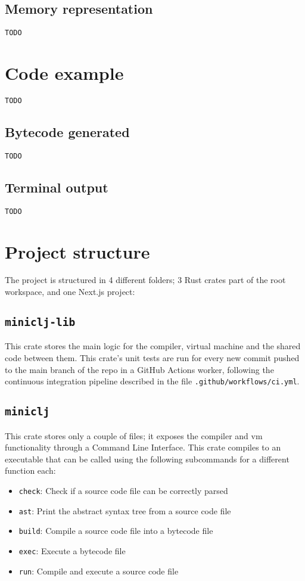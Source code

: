 \documentclass[11pt]{scrreprt}
\begin{document}
\section{Memory representation}
\texttt{TODO}


\chapter{Code example}
\texttt{TODO}

\section{Bytecode generated}
\texttt{TODO}

\section{Terminal output}
\texttt{TODO}


\chapter{Project structure}
The project is structured in 4 different folders; 3 Rust crates part of the root workspace, and one Next.js project:

\section{\texttt{miniclj-lib}}
This crate stores the main logic for the compiler, virtual machine and the shared code between them. This crate's unit tests are run for every new commit pushed to the main branch of the repo in a GitHub Actions worker, following the continuous integration pipeline described in the file \texttt{.github/workflows/ci.yml}.

\section{\texttt{miniclj}}
This crate stores only a couple of files; it exposes the compiler and vm functionality through a Command Line Interface. This crate compiles to an executable that can be called using the following subcommands for a different function each:
\begin{itemize}
  \item \texttt{check}: Check if a source code file can be correctly parsed 
  \item \texttt{ast}: Print the abstract syntax tree from a source code file
  \item \texttt{build}: Compile a source code file into a bytecode file
  \item \texttt{exec}: Execute a bytecode file
  \item \texttt{run}: Compile and execute a source code file
\end{itemize}
\end{document}

